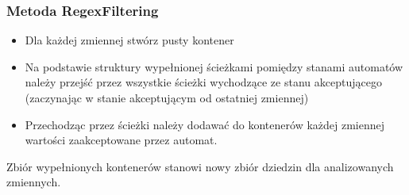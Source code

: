 \documentclass{beamer}
\begin{document}
    \begin{frame}
        \frametitle{Metoda RegexFiltering}
        \begin{itemize}
            \item Dla każdej zmiennej stwórz pusty kontener
            \item Na podstawie struktury wypełnionej ścieżkami pomiędzy stanami automatów
                należy przejść przez wszystkie ścieżki wychodzące ze stanu akceptującego
                (zaczynając w stanie akceptującym od ostatniej zmiennej)
            \item Przechodząc przez ścieżki należy dodawać do kontenerów każdej zmiennej
                wartości zaakceptowane przez automat.
        \end{itemize}
        Zbiór wypełnionych kontenerów stanowi nowy zbiór dziedzin dla analizowanych zmiennych.
    \end{frame}
\end{document}
